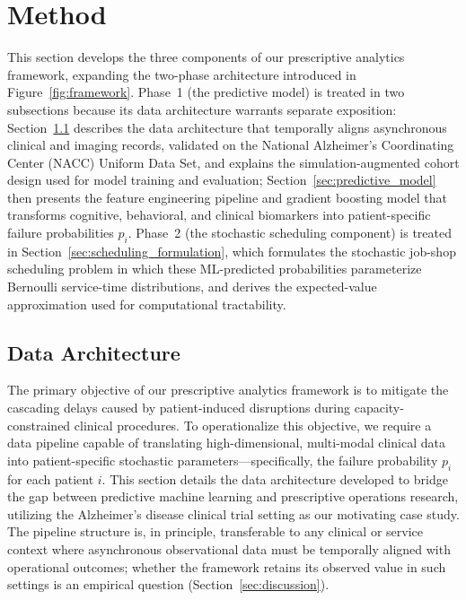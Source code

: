 \documentclass[11pt,a4paper]{article}
\begin{document}
\newpage
\section{Method}

This section develops the three components of our prescriptive analytics framework, expanding the two-phase architecture introduced in Figure~\ref{fig:framework}. Phase~1 (the predictive model) is treated in two subsections because its data architecture warrants separate exposition: Section~\ref{sec:data_architecture} describes the data architecture that temporally aligns asynchronous clinical and imaging records, validated on the National Alzheimer's Coordinating Center (NACC) Uniform Data Set, and explains the simulation-augmented cohort design used for model training and evaluation; Section~\ref{sec:predictive_model} then presents the feature engineering pipeline and gradient boosting model that transforms cognitive, behavioral, and clinical biomarkers into patient-specific failure probabilities $p_i$. Phase~2 (the stochastic scheduling component) is treated in Section~\ref{sec:scheduling_formulation}, which formulates the stochastic job-shop scheduling problem in which these ML-predicted probabilities parameterize Bernoulli service-time distributions, and derives the expected-value approximation used for computational tractability.

\subsection{Data Architecture}
\label{sec:data_architecture}

The primary objective of our prescriptive analytics framework is to mitigate the cascading delays caused by patient-induced disruptions during capacity-constrained clinical procedures. To operationalize this objective, we require a data pipeline capable of translating high-dimensional, multi-modal clinical data into patient-specific stochastic parameters---specifically, the failure probability $p_i$ for each patient $i$. This section details the data architecture developed to bridge the gap between predictive machine learning and prescriptive operations research, utilizing the Alzheimer's disease clinical trial setting as our motivating case study. The pipeline structure is, in principle, transferable to any clinical or service context where asynchronous observational data must be temporally aligned with operational outcomes; whether the framework retains its observed value in such settings is an empirical question (Section~\ref{sec:discussion}).
\end{document}
